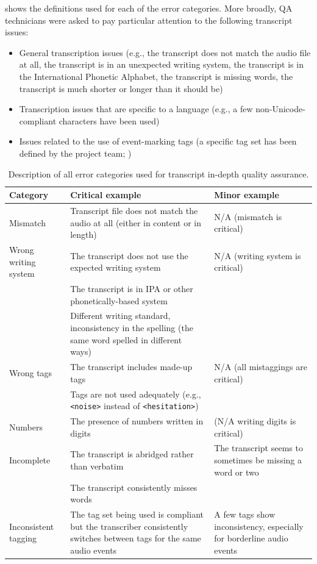  shows the definitions used for each of the error categories. More broadly, QA technicians were asked to pay particular attention to the following transcript issues:
\begin{itemize}
\item General transcription issues (e.g., the transcript does not match the audio file at all, the transcript is in an unexpected writing system, the transcript is in the International Phonetic Alphabet, the transcript is missing words, the transcript is much shorter or longer than it should be)
\item Transcription issues that are specific to a language (e.g., a few non-Unicode-compliant characters have been used)
\item Issues related to the use of event-marking tags (a specific tag set has been defined by the project team; )
\end{itemize}
\begin{table}[!ht]
    \centering
    \begin{tabular}{p{3.5cm}p{6cm}p{5.5cm}}
    \toprule
     \textbf{Category}  & \textbf{Critical example} & \textbf{Minor example} \\
     \midrule
    \small{Mismatch} & \small{Transcript file does not match the audio at all (either in content or in length) } & \small{N/A (mismatch is critical)} \\
\midrule
\small{Wrong writing system} & \small{The transcript does not use the expected writing system}  & \small{N/A (writing system is critical)} \\
 & \small{The transcript is in IPA or other phonetically-based system} & \\
 & \small{Different writing standard, inconsistency in the spelling (the same word spelled in different ways)} & \\
\midrule
\small{Wrong tags} & \small{The transcript includes made-up tags} & \small{N/A (all mistaggings are critical)} \\
 & \small{Tags are not used adequately (e.g., \texttt{<noise>} instead of \texttt{<hesitation>})} & \\
\midrule
\small{Numbers} & \small{The presence of numbers written in digits} & \small{(N/A writing digits is critical)} \\
\midrule
\small{Incomplete} &  \small{The transcript is abridged rather than verbatim} & \small{The transcript seems to sometimes be missing a word or two} \\
 & \small{The transcript consistently misses words} \\
\midrule
\small{Inconsistent tagging} & \small{The tag set being used is compliant but the transcriber consistently switches between tags for the same audio events} & \small{A few tags show inconsistency, especially for borderline audio events} \\

     \bottomrule
    \end{tabular}
    \caption{Description of all error categories used for transcript in-depth quality assurance.}
    \label{tab:transcript_qa_errors}
\end{table}